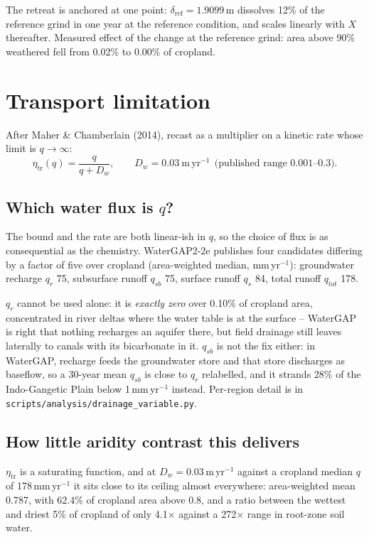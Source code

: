 \documentclass[11pt,a4paper]{article}
\begin{document}
The retreat is anchored at one point: $\delta_{\mathrm{ref}} =
1.9099$\,\textmu m dissolves 12\% of the reference
grind in one year at the reference condition, and scales linearly with $X$
thereafter. Measured effect of the change at the reference grind: area above 90\%
weathered fell from 0.02\% to 0.00\% of cropland.

\section{Transport limitation}
\label{sec:transport}

After Maher \& Chamberlain (2014), recast as a multiplier on a kinetic rate whose
limit is $q \to \infty$:
\begin{equation}
\eta_{\mathrm{tr}}(q) = \frac{q}{q + D_w},
\qquad D_w = 0.03\ \mathrm{m\,yr^{-1}}
\ \ \text{(published range 0.001--0.3)}.
\end{equation}

\subsection{Which water flux is $q$?}

The bound and the rate are both linear-ish in $q$, so the choice of flux is as
consequential as the chemistry. WaterGAP2-2e publishes four candidates differing
by a factor of five over cropland (area-weighted median, mm\,yr$^{-1}$):
groundwater recharge $q_r$ 75, subsurface runoff $q_{sb}$
75, surface runoff $q_s$ 84, total runoff $q_{tot}$
178.

$q_r$ cannot be used alone: it is \emph{exactly zero} over 0.10\% of
cropland area, concentrated in river deltas where the water table is at the
surface -- WaterGAP is right that nothing recharges an aquifer there, but field
drainage still leaves laterally to canals with its bicarbonate in it. $q_{sb}$ is
not the fix either: in WaterGAP, recharge feeds the groundwater store and that
store discharges as baseflow, so a 30-year mean $q_{sb}$ is close to $q_r$
relabelled, and it strands 28\% of the Indo-Gangetic Plain below
1\,mm\,yr$^{-1}$ instead. Per-region detail is in
\texttt{scripts/analysis/drainage\_variable.py}.

\subsection{How little aridity contrast this delivers}

$\eta_{\mathrm{tr}}$ is a saturating function, and at
$D_w = 0.03$\,m\,yr$^{-1}$ against a cropland median $q$ of
178\,mm\,yr$^{-1}$ it sits close to its ceiling almost
everywhere: area-weighted mean 0.787, with 62.4\% of cropland
area above 0.8, and a ratio between the wettest and driest 5\% of cropland of only
4.1$\times$ against a 272$\times$ range in root-zone soil water.
\end{document}
